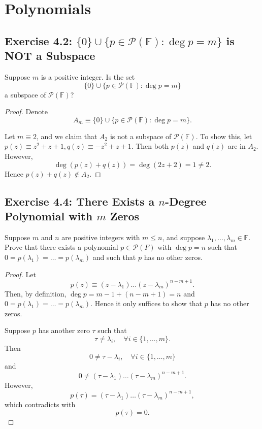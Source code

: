 
\chapter{Polynomials}
\section{Exercise 4.2: $\{0\}\cup\{p\in\mathcal{P}(\mathbb{F}):\deg p=m\}$ is NOT a Subspace}
Suppose $m$ is a positive integer. Is the set\[
\{0\}\cup\{p\in\mathcal{P}(\mathbb{F}):\deg p=m\}
\]a subspace of $\mathcal{P}(\mathbb{F})$?
\begin{proof}
Denote\[
A_m\equiv \{0\}\cup\{p\in\mathcal{P}(\mathbb{F}):\deg p=m\}.
\]

Let $m\equiv 2$, and we claim that $A_2$ is not a subspace of $\mathcal{P}(\mathbb{F})$. To show this, let $p(z)\equiv z^2+z+1, q(z)\equiv -z^2+z+1$. Then both $p(z)$ and $q(z)$ are in $A_2$. However,\[
\deg \left(p(z)+q(z)\right)=\deg \left(2z+2\right)=1\ne 2.
\]Hence $p(z)+q(z)\notin A_2$.
\end{proof}
\section{Exercise 4.4: There Exists a $n$-Degree Polynomial with $m$ Zeros}
Suppose $m$ and $n$ are positive integers with $m\leqslant n$, and suppose $\lambda_1,\dots,\lambda_m\in\mathbb{F}$. Prove that there exists a polynomial $p\in\mathcal{P}(F)$ with $\deg p=n$ such that $0=p(\lambda_1)=\dots=p(\lambda_m)$ and such that $p$ has no other zeros.
\begin{proof}
Let\[
p(z)\equiv(z-\lambda_1)\dots (z-\lambda_m)^{n-m+1}.
\]Then, by definition, $\deg p=m-1+(n-m+1)=n$ and $0=p(\lambda_1)=\dots=p(\lambda_m)$. Hence it only suffices to show that $p$ has no other zeros.

Suppose $p$ has another zero $\tau$ such that\[
\tau\ne\lambda_i,\quad\forall i\in\{1,\dots,m\}.
\]Then\[
0\ne\tau-\lambda_i,\quad\forall i\in\{1,\dots,m\}
\]and\[
0\ne(\tau-\lambda_1)\dots (\tau-\lambda_m)^{n-m+1}.
\]However,\[
p(\tau)=(\tau-\lambda_1)\dots (\tau-\lambda_m)^{n-m+1},
\]which contradicts with\[
p(\tau)=0.
\]
\end{proof}
